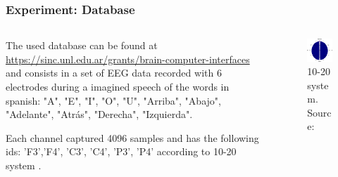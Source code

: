 \begin{frame}[allowframebreaks]
	\frametitle{Experiment: Database}
   	\begin{columns}
    	\begin{column}{0.5\textwidth}
			\par The used  database \cite{PRG16} can be found at \href{https://sinc.unl.edu.ar/grants/brain-computer-interfaces/}{https://sinc.unl.edu.ar/grants/brain-computer-interfaces} and consists in a set of EEG data recorded with 6 electrodes during a imagined speech of the words in spanish: 
		    "A", "E", "I", "O", "U", "Arriba", "Abajo", "Adelante", "Atrás", "Derecha", "Izquierda".\newline
		    
		    \par Each channel captured 4096 samples and has the following ids: 'F3','F4', 'C3', 'C4', 'P3', 'P4' according to 10-20 system \cite{ScienceOpenVid:5960cfa8-7fde-441c-8592-35fdb9841499}.
    	\end{column}
    	\begin{column}{0.5\textwidth}
    		\begin{figure}
    			\centering
    			\includegraphics[width=\linewidth]{images/sistema10-20}
    			\caption{10-20 system. Source: \cite{sistema10-20}}
    			\label{fig:sistema10-20}
    		\end{figure}
    	\end{column}
    \end{columns}


\end{frame}

